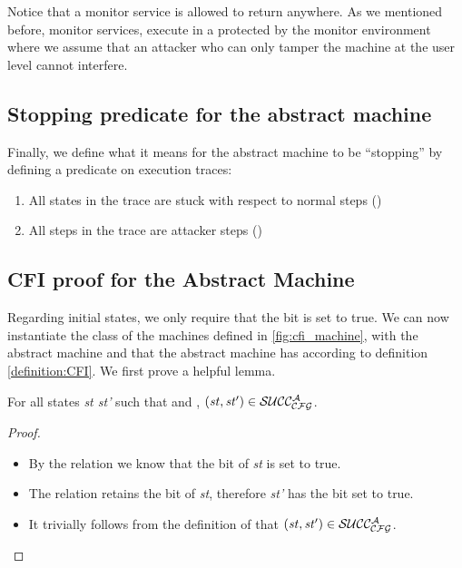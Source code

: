 Notice that a monitor service is allowed to return anywhere. As we
mentioned before, monitor services, execute in a protected by the
monitor environment where we assume that an attacker who can only
tamper the machine at the user level cannot interfere.

\subsection{Stopping predicate for the abstract machine}
\label{sec:abstract_stopping}

Finally, we define what it means for the abstract machine to be ``stopping'' by
defining a predicate on execution traces:
\begin{enumerate}
\item All states in the trace are stuck with respect to normal steps
  (\stepn{}{})
\item All steps in the trace are attacker steps (\stepa{}{}{})
\end{enumerate}

\subsection{CFI proof for the Abstract Machine}\label{abstract_proof}

Regarding initial states, we only require that the \ok bit is set to true.
We can now instantiate the class of the machines defined in 
\ref{fig:cfi_machine}, with the abstract machine and that the abstract machine
has \CFI according to definition \ref{definition:CFI}.
We first prove a helpful lemma.

\begin{lemma}
\label{lemma:attacker_no_v}
For all states \textit{st st'} such that 
and , $(\mathit{st},\mathit{st'}) \in \mathcal{SUCC_\mathcal{CFG}^{A}}$.
\end{lemma}

\begin{proof}
~
\begin{itemize}
\item By the relation  we know that the \ok bit
of \textit{st} is set to true. 
\item The relation  retains the \ok bit of
\textit{st}, therefore \textit{st'} has the \ok bit set to true.
\item It trivially follows from the definition of  that
$(\mathit{st},\mathit{st'}) \in \mathcal{SUCC_\mathcal{CFG}^{A}}$.
\end{itemize}
\end{proof}

